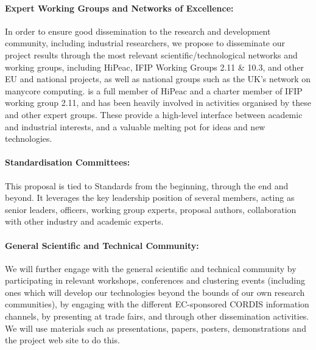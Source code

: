 \documentclass[a4paper,11pt]{article}
\begin{document}
 \paragraph{Expert Working Groups and Networks of Excellence:}
In order to ensure good dissemination to the research and development
community, including industrial researchers, we propose to disseminate
our project results through the most relevant scientific/technological
networks and working groups, including HiPeac,%
IFIP Working Groups 2.11 \& 10.3, and other EU and national projects,
as well as national groups such as the UK's network on manycore computing.
\SAshort{} is a full member of HiPeac and a charter member of IFIP working
group 2.11, and has been heavily involved in activities organised by these and other expert groups.
These provide a high-level interface between academic and industrial interests, and a valuable
melting pot for ideas and new technologies. 

\paragraph{Standardisation Committees:}
This proposal is tied to Standards from the beginning, through the end and beyond. It leverages the key leadership position of several members, acting as senior leaders, officers, working group experts, proposal authors, collaboration with other industry and academic experts.
%
%

\paragraph{General Scientific and Technical Community:}
We will further engage with the general scientific and technical community
 by participating in relevant workshops, conferences and clustering events (including ones which
 will develop our technologies beyond the bounds of our own research communities), by engaging with the
 different EC-sponsored CORDIS information channels, by presenting at trade
 fairs, and through other dissemination activities.  We will use materials such as presentations,
 papers,  posters, demonstrations and the project web site to do this.
\end{document}
